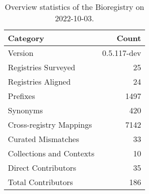\begin{table}
\centering
\caption{Overview statistics of the Bioregistry on 2022-10-03.}
\label{tab:bioregistry-summary}
\begin{tabular}{lr}
\toprule
                Category &       Count \\
\midrule
                 Version & 0.5.117-dev \\
     Registries Surveyed &          25 \\
      Registries Aligned &          24 \\
                Prefixes &        1497 \\
                Synonyms &         420 \\
 Cross-registry Mappings &        7142 \\
      Curated Mismatches &          33 \\
Collections and Contexts &          10 \\
     Direct Contributors &          35 \\
      Total Contributors &         186 \\
\bottomrule
\end{tabular}
\end{table}
